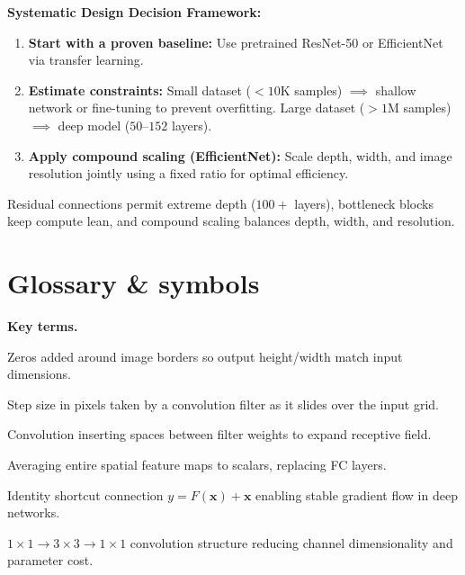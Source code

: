 \documentclass[a4paper,11pt]{article}
\begin{document}
\noindent\textbf{Systematic Design Decision Framework:}
\begin{enumerate}[leftmargin=1.5em]
  \item \textbf{Start with a proven baseline:} Use pretrained ResNet-50 or EfficientNet via transfer learning.
  \item \textbf{Estimate constraints:} Small dataset ($<10\text{K}$ samples) $\implies$ shallow network or fine-tuning to prevent overfitting. Large dataset ($>1\text{M}$ samples) $\implies$ deep model ($50$--$152$ layers).
  \item \textbf{Apply compound scaling (EfficientNet):} Scale depth, width, and image resolution jointly using a fixed ratio for optimal efficiency.
\end{enumerate}

\begin{keytake}
Residual connections permit extreme depth ($100+$ layers), bottleneck blocks keep compute lean, and compound scaling balances depth, width, and resolution.
\end{keytake}


\section*{Glossary \& symbols}

\noindent\textbf{Key terms.}
\begin{description}[leftmargin=9.5em,style=nextline,font=\normalfont\bfseries\color{navy}]
  \item[Same Padding] Zeros added around image borders so output height/width match input dimensions.
  \item[Stride] Step size in pixels taken by a convolution filter as it slides over the input grid.
  \item[Dilated Conv] Convolution inserting spaces between filter weights to expand receptive field.
  \item[Global Average Pooling] Averaging entire spatial feature maps to scalars, replacing FC layers.
  \item[Residual Connection] Identity shortcut connection $y = F(\mathbf{x}) + \mathbf{x}$ enabling stable gradient flow in deep networks.
  \item[Bottleneck Block] $1\times1 \to 3\times3 \to 1\times1$ convolution structure reducing channel dimensionality and parameter cost.
\end{description}
\end{document}
